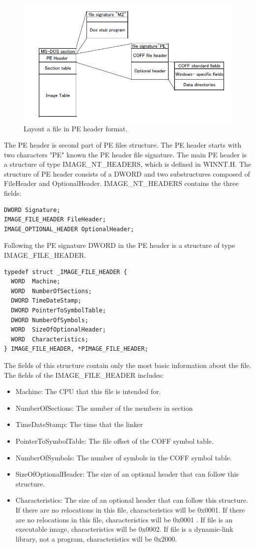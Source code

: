 \begin{figure}[httb]
\centering
\includegraphics[width=1\textwidth]{graph/peheader1.jpg}
\caption{Layout a file in PE header format.}
\label{fig:peheader}
\end{figure}
The PE header is second part of PE files structure. The PE header starts with two characters "PE" known the PE header file signature. The main PE header is a structure of type IMAGE\_NT\_HEADERS, which is defined in WINNT.H. The structure of PE header consists of a DWORD and two substructures composed of FileHeader and OptionalHeader. IMAGE\_NT\_HEADERS contains the three fields:
\begin{verbatim}
DWORD Signature;
IMAGE_FILE_HEADER FileHeader;
IMAGE_OPTIONAL_HEADER OptionalHeader;
\end{verbatim}
Following the PE signature DWORD in the PE header is a structure of type IMAGE\_FILE\_HEADER. 
\begin{verbatim}
typedef struct _IMAGE_FILE_HEADER {
  WORD  Machine;
  WORD  NumberOfSections;
  DWORD TimeDateStamp;
  DWORD PointerToSymbolTable;
  DWORD NumberOfSymbols;
  WORD  SizeOfOptionalHeader;
  WORD  Characteristics;
} IMAGE_FILE_HEADER, *PIMAGE_FILE_HEADER;
\end{verbatim}
The fields of this structure contain only the most basic information about the file. The fields of the IMAGE\_FILE\_HEADER includes:
\begin{itemize}
\item Machine: The CPU that this file is intended for.
\item NumberOfSections: The number of the members in section
\item TimeDateStamp: The time that the linker
\item PointerToSymbolTable: The file offset of the COFF symbol table. 
\item NumberOfSymbols: The number of symbols in the COFF symbol table.
\item SizeOfOptionalHeader: The size of an optional header that can follow this structure.
\item Characteristics: The size of an optional header that can follow this structure. If there are no relocations in this file, characteristics will be 0x0001. If there are no relocations in this file, characteristics will be 0x0001 . If file is an executable image, characteristics will be 0x0002.  If file is a dynamic-link library, not a program, characteristics will be 0x2000.
\end{itemize}



